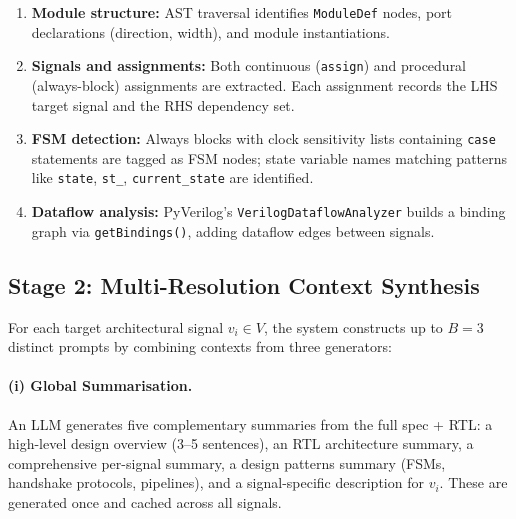 \documentclass[12pt,a4paper]{article}
\begin{document}
\begin{enumerate}[noitemsep, label=\arabic*.]
  \item \textbf{Module structure:} AST traversal identifies \texttt{ModuleDef}
        nodes, port declarations (direction, width), and module instantiations.
  \item \textbf{Signals and assignments:} Both continuous (\texttt{assign})
        and procedural (always-block) assignments are extracted. Each assignment
        records the LHS target signal and the RHS dependency set.
  \item \textbf{FSM detection:} Always blocks with clock sensitivity lists
        containing \texttt{case} statements are tagged as FSM nodes; state
        variable names matching patterns like \texttt{state}, \texttt{st\_},
        \texttt{current\_state} are identified.
  \item \textbf{Dataflow analysis:} PyVerilog's \texttt{VerilogDataflowAnalyzer}
        builds a binding graph via \texttt{getBindings()}, adding dataflow edges
        between signals.
\end{enumerate}




\subsection{Stage 2: Multi-Resolution Context Synthesis}

For each target architectural signal $v_i \in V$, the system constructs up to
$B=3$ distinct prompts by combining contexts from three generators:

\paragraph{(i) Global Summarisation.}
An LLM generates five complementary summaries from the full spec + RTL:
a high-level design overview (3--5 sentences), an RTL architecture summary,
a comprehensive per-signal summary, a design patterns summary (FSMs,
handshake protocols, pipelines), and a signal-specific description for $v_i$.
These are generated once and cached across all signals.
\end{document}
